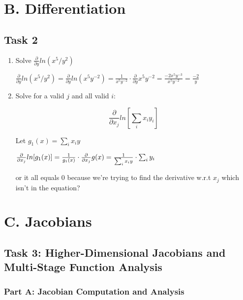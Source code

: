 \documentclass[12pt]{article}
\begin{document}
\section{B. Differentiation}
\subsection{Task 2}
\begin{enumerate}
	\item Solve $\frac{\partial}{\partial y}ln(x^5/y^2)$
	
	$\frac{\partial}{\partial y}ln(x^5/y^2) = \frac{\partial}{\partial y} ln(x^5y^{-2}) = \frac{1}{x^5y^{-2}} \cdot \frac{\partial}{\partial y}x^5y^{-2} = \frac{-2x^5y^{-3}}{x^5y^{-2}} = \frac{-2}{y}$
	\item Solve for a valid $j$ and all valid $i$: 
	
	\[ \frac{\partial}{\partial x_j}ln\left[\sum_i x_iy_i\right]\] 
	
	Let $g_1(x) = \sum_i x_iy$
	
	$\frac{\partial}{\partial x_j} ln\lbrack g_1(x) \rbrack \\
	= \frac{1}{g_1(x)} \cdot \frac{\partial}{\partial x_j}g(x) \\
	= \frac{1}{\sum_i x_iy} \cdot \sum_i y_i$
	
	or it all equals 0 because we're trying to find the derivative w.r.t $x_j$ which isn't in the equation?
\end{enumerate}

\section{C. Jacobians}
\subsection{Task 3: Higher-Dimensional Jacobians and Multi-Stage Function Analysis}
\subsubsection{Part A: Jacobian Computation and Analysis}
\end{document}
